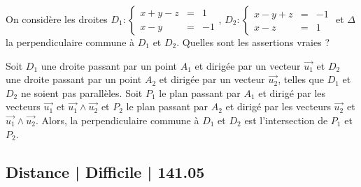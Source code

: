 \begin{question} 


On considère les droites $D_1 : \left\{\begin{array}{ccl}x+y-z&=&1\\x-y&=&-1 \end{array}\right.$,  
$D_2 : \left\{\begin{array}{ccl}x-y+z&=&-1\\x-z&=&1 \end{array}\right.$
 et $\Delta$ la perpendiculaire commune à $D_1$ et $D_2$. Quelles sont les assertions vraies ?
\begin{answers}





 
    
   
    
     
   
\end{answers}
\begin{explanations}
Soit $D_1$ une droite passant par un point $A_1$ et dirigée par un vecteur $\vec{u_1}$ et 
 $D_2$ une droite passant par un point $A_2$ et dirigée par un vecteur $\vec{u_2}$, telles que $D_1$ et $D_2$ ne soient pas parallèles. Soit $P_1$ le plan passant par $A_1$ et dirigé par les vecteurs $\vec{u_1}$ et $\vec{u_1} \wedge \vec{u_2}$ et 
 $P_2$ le plan passant par $A_2$ et dirigé par les vecteurs $\vec{u_2}$ et $\vec{u_1} \wedge \vec{u_2}$. Alors, la perpendiculaire commune à $D_1$ et $D_2$ est l'intersection de $P_1$ et $P_2$.
\end{explanations}

\end{question}


\subsection{Distance | Difficile | 141.05}


